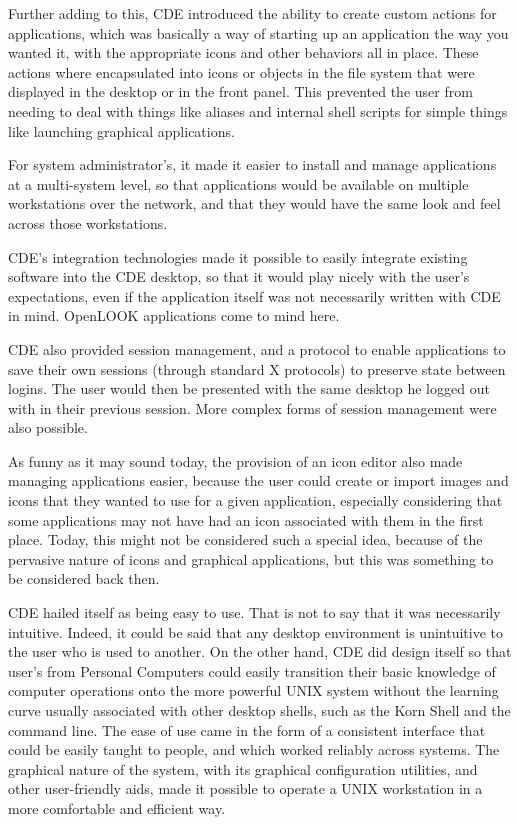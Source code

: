 Further adding to this, CDE introduced the ability to create custom
actions for applications, which was basically a way of starting up an
application the way you wanted it, with the appropriate icons and other
behaviors all in place. These actions where encapsulated into icons or
objects in the file system that were displayed in the desktop or in the
front panel. This prevented the user from needing to deal with things
like aliases and internal shell scripts for simple things like launching
graphical applications.

For system administrator's, it made it easier to install and manage
applications at a multi-system level, so that applications would be
available on multiple workstations over the network, and that they would
have the same look and feel across those workstations.

CDE's integration technologies made it possible to easily integrate
existing software into the CDE desktop, so that it would play nicely
with the user's expectations, even if the application itself was not
necessarily written with CDE in mind. OpenLOOK applications come to mind
here.

CDE also provided session management, and a protocol to enable
applications to save their own sessions (through standard X protocols)
to preserve state between logins. The user would then be presented with
the same desktop he logged out with in their previous session. More
complex forms of session management were also possible. 

As funny as it may sound today, the provision of an icon editor also
made managing applications easier, because the user could create or
import images and icons that they wanted to use for a given application,
especially considering that some applications may not have had an icon
associated with them in the first place. Today, this might not be
considered such a special idea, because of the pervasive nature of icons
and graphical applications, but this was something to be considered back
then.

CDE hailed itself as being easy to use. That is not to say that it was
necessarily intuitive. Indeed, it could be said that any desktop
environment is unintuitive to the user who is used to another. On the
other hand, CDE did design itself so that user's from Personal Computers
could easily transition their basic knowledge of computer operations
onto the more powerful UNIX system without the learning curve usually
associated with other desktop shells, such as the Korn Shell and the
command line. The ease of use came in the form of a consistent interface
that could be easily taught to people, and which worked reliably across
systems. The graphical nature of the system, with its graphical
configuration utilities, and other user-friendly aids, made it possible
to operate a UNIX workstation in a more comfortable and efficient way.


